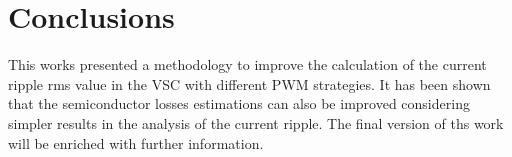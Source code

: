 \documentclass[10pt, conference]{IEEEtran}
\begin{document}
\section{{Conclusions}}

{This works presented a methodology to improve the calculation of the current ripple rms value in the VSC with different PWM strategies. It has been shown that the semiconductor losses estimations  can also be improved considering simpler results in the analysis of the current ripple.  The final version of ths work will be enriched with further information. }



%
\end{document}
